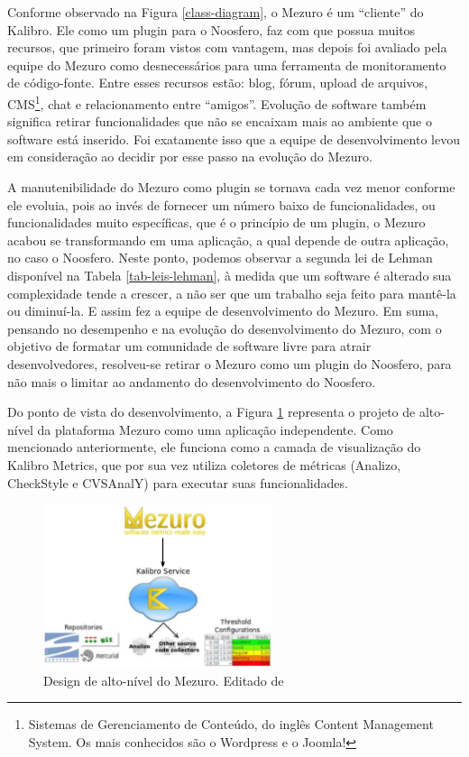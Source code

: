 Conforme observado na Figura \ref{class-diagram}, o Mezuro é um ``cliente'' do Kalibro. Ele como um plugin para o Noosfero, faz com que possua muitos recursos, que primeiro foram vistos com vantagem, mas depois foi avaliado pela equipe do Mezuro como desnecessários para uma ferramenta de monitoramento de código-fonte. Entre esses recursos estão: blog, fórum, upload de arquivos, CMS\footnote{Sistemas de Gerenciamento de Conteúdo, do inglês Content Management System. Os mais conhecidos são o Wordpress e o Joomla!}, chat e relacionamento entre  ``amigos''. Evolução de software também significa retirar funcionalidades que não se encaixam mais ao ambiente que o software está inserido. Foi exatamente isso que a equipe de desenvolvimento levou em consideração ao decidir por esse passo na evolução do Mezuro.

A manutenibilidade do Mezuro como plugin se tornava cada vez menor conforme ele evoluia, pois ao invés de fornecer um número baixo de funcionalidades, ou funcionalidades muito específicas, que é o princípio de um plugin, o Mezuro acabou se transformando em uma aplicação, a qual depende de outra aplicação, no caso o Noosfero. Neste ponto, podemos observar a segunda lei de Lehman disponível na Tabela \ref{tab-leis-lehman}, à medida que um software é alterado sua complexidade tende a crescer, a não ser que um trabalho seja feito para mantê-la ou diminuí-la. E assim fez a equipe de desenvolvimento do Mezuro.
%
Em suma, pensando no desempenho e na evolução do desenvolvimento do Mezuro, com o objetivo de formatar um comunidade de software livre para atrair desenvolvedores, resolveu-se retirar o Mezuro como um plugin do Noosfero, para não mais o limitar ao andamento do desenvolvimento do Noosfero. 

Do ponto de vista do desenvolvimento, a Figura \ref{mezuro-design} representa o projeto de alto-nível da plataforma Mezuro como uma aplicação independente. Como mencionado anteriormente, ele funciona como a camada de visualização do Kalibro Metrics, que por sua vez utiliza coletores de métricas (Analizo, CheckStyle e CVSAnalY) para executar suas funcionalidades.

\graphicspath{{figuras/}}
\begin{figure}[h]
\centering
\includegraphics[width=0.6\textwidth]{mezuro-standalone-design}
\caption{Design de alto-nível do Mezuro. Editado de \cite{meirelles2010mezuro}}
\label{mezuro-design}
\end{figure}

